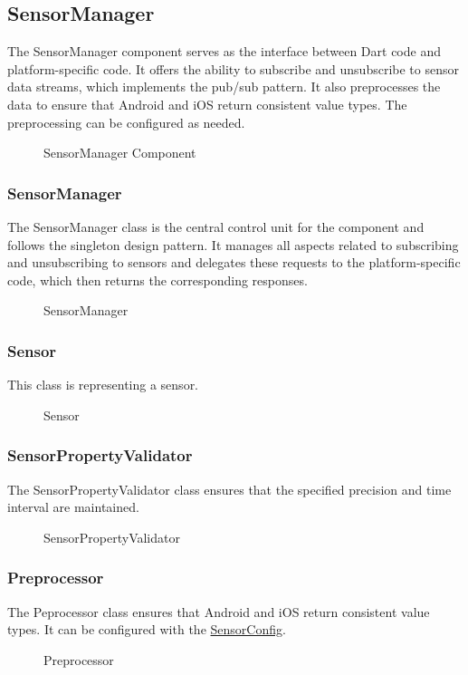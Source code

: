\documentclass[12pt]{article}
\begin{document}
\subsection{SensorManager}
The SensorManager component serves as the interface between Dart code and platform-specific code. It offers the ability to subscribe and unsubscribe to sensor data streams, which implements the pub/sub pattern. It also preprocesses the data to ensure that Android and iOS return consistent value types. The preprocessing can be configured as needed.
\begin{figure}[ht]
\centering

\caption{\label{fig:bild9} SensorManager Component}
\end{figure}
\newpage
\subsubsection{SensorManager}
The SensorManager class is the central control unit for the component and follows the singleton design pattern. It manages all aspects related to subscribing and unsubscribing to sensors and delegates these requests to the platform-specific code, which then returns the corresponding responses.
\begin{figure}[ht]
\centering

\caption{\label{fig:bild10} SensorManager}
\end{figure}

\subsubsection{Sensor}
This class is representing a sensor.
\begin{figure}[ht]
\centering

\caption{\label{fig:bild11} Sensor}
\end{figure}
\newpage

\subsubsection{SensorPropertyValidator}
The SensorPropertyValidator class ensures that the specified precision and time interval are maintained.
\begin{figure}[ht]
\centering

\caption{\label{fig:bild12} SensorPropertyValidator}
\end{figure}


\subsubsection{Preprocessor}
The Peprocessor class ensures that Android and iOS return consistent value types. It can be configured with the \hyperref[fig:bild14]{SensorConfig}.
\begin{figure}[ht]
\centering

\caption{\label{fig:bild13} Preprocessor}
\end{figure}
\newpage
\end{document}
